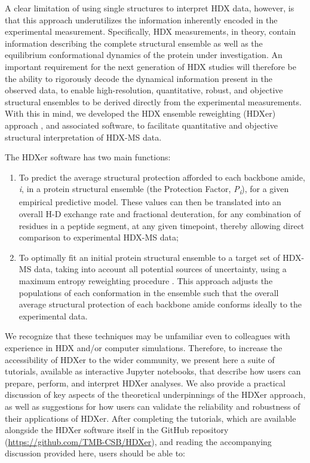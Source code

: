 \documentclass[9pt,tutorial]{livecoms}
\begin{document}
A clear limitation of using single structures to interpret HDX data, however, is that this approach underutilizes the information inherently encoded in the experimental measurement.
Specifically, HDX measurements, in theory, contain information describing the complete structural ensemble as well as the equilibrium conformational dynamics of the protein under investigation.
An important requirement for the next generation of HDX studies will therefore be the ability to rigorously decode the dynamical information present in the observed data, to enable high-resolution, quantitative, robust, and objective structural ensembles to be derived directly from the experimental measurements.
With this in mind, we developed the HDX ensemble reweighting (HDXer) approach \cite{Bradshaw2020}, and associated software, to facilitate quantitative and objective structural interpretation of HDX-MS data.

The HDXer software has two main functions:

\begin{enumerate}
\item To predict the average structural protection afforded to each backbone amide, \textit{i}, in a protein structural ensemble (the Protection Factor, \textit{P\textsubscript{i}}), for a given empirical predictive model. These values can then be translated into an overall H-D exchange rate and fractional deuteration, for any combination of residues in a peptide segment, at any given timepoint, thereby allowing direct comparison to experimental HDX-MS data;

\item To optimally fit an initial protein structural ensemble to a target set of HDX-MS data, taking into account all potential sources of uncertainty, using a maximum entropy reweighting procedure \cite{Pitera2012, Boomsma2014, Marinelli2019}. This approach adjusts the populations of each conformation in the ensemble such that the overall average structural protection of each backbone amide conforms ideally to the experimental data.
\end{enumerate}

We recognize that these techniques may be unfamiliar even to colleagues with experience in HDX and/or computer simulations. 
Therefore, to increase the accessibility of HDXer to the wider community, we present here a suite of tutorials, available as interactive Jupyter notebooks, that describe how users can prepare, perform, and interpret HDXer analyses. 
We also provide a practical discussion of key aspects of the theoretical underpinnings of the HDXer approach, as well as suggestions for how users can validate the reliability and robustness of their applications of HDXer.
After completing the tutorials, which are available alongside the HDXer software itself in the GitHub repository (\url{https://github.com/TMB-CSB/HDXer}), and reading the accompanying discussion provided here, users should be able to:
\end{document}
